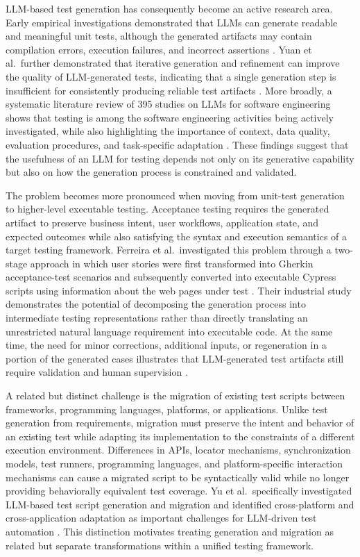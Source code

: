 \documentclass[pdflatex,sn-mathphys-num]{sn-jnl}
\begin{document}
LLM-based test generation has consequently become an active research area.
Early empirical investigations demonstrated that LLMs can generate readable
and meaningful unit tests, although the generated artifacts may contain
compilation errors, execution failures, and incorrect assertions
\cite{yuan2024chatgpt}. Yuan et al.\ further demonstrated that iterative
generation and refinement can improve the quality of LLM-generated tests,
indicating that a single generation step is insufficient for consistently
producing reliable test artifacts \cite{yuan2024chatgpt}. More broadly, a
systematic literature review of 395 studies on LLMs for software engineering
shows that testing is among the software engineering activities being actively
investigated, while also highlighting the importance of context, data quality,
evaluation procedures, and task-specific adaptation
\cite{hou2024llmslr}. These findings suggest that the usefulness of an LLM for
testing depends not only on its generative capability but also on how the
generation process is constrained and validated.

The problem becomes more pronounced when moving from unit-test generation to
higher-level executable testing. Acceptance testing requires the generated
artifact to preserve business intent, user workflows, application state, and
expected outcomes while also satisfying the syntax and execution semantics of
a target testing framework. Ferreira et al.\ investigated this problem through
a two-stage approach in which user stories were first transformed into
Gherkin acceptance-test scenarios and subsequently converted into executable
Cypress scripts using information about the web pages under test
\cite{ferreira2025acceptance}. Their industrial study demonstrates the
potential of decomposing the generation process into intermediate testing
representations rather than directly translating an unrestricted natural
language requirement into executable code. At the same time, the need for
minor corrections, additional inputs, or regeneration in a portion of the
generated cases illustrates that LLM-generated test artifacts still require
validation and human supervision \cite{ferreira2025acceptance}.

A related but distinct challenge is the migration of existing test scripts
between frameworks, programming languages, platforms, or applications. Unlike
test generation from requirements, migration must preserve the intent and
behavior of an existing test while adapting its implementation to the
constraints of a different execution environment. Differences in APIs,
locator mechanisms, synchronization models, test runners, programming
languages, and platform-specific interaction mechanisms can cause a migrated
script to be syntactically valid while no longer providing behaviorally
equivalent test coverage. Yu et al.\ specifically investigated LLM-based test
script generation and migration and identified cross-platform and
cross-application adaptation as important challenges for LLM-driven test
automation \cite{yu2023testscript}. This distinction motivates treating
generation and migration as related but separate transformations within a
unified testing framework.
\end{document}
